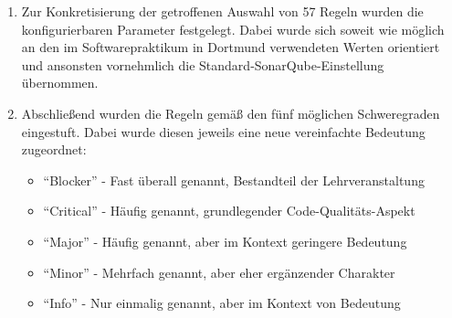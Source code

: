 \documentclass[da,ngerman]{stthesis}
\begin{document}
\begin{enumerate}
					\item Zur Konkretisierung der getroffenen Auswahl von 57 Regeln wurden die konfigurierbaren Parameter festgelegt. Dabei wurde sich soweit wie möglich an den im Softwarepraktikum in Dortmund verwendeten Werten orientiert \cite{ImproveCodeQuality} und ansonsten vornehmlich die Standard-SonarQube-Einstellung übernommen.
					\item Abschließend wurden die Regeln gemäß den fünf möglichen Schweregraden eingestuft. Dabei wurde diesen jeweils eine neue vereinfachte Bedeutung zugeordnet: 
						\begin{itemize}
							\item "`Blocker"' - Fast überall genannt, Bestandteil der Lehrveranstaltung
							\item "`Critical"' - Häufig genannt, grundlegender Code-Qualitäts-Aspekt
							\item "`Major"' - Häufig genannt, aber im Kontext geringere Bedeutung
							\item "`Minor"' - Mehrfach genannt, aber eher ergänzender Charakter
				\item "`Info"' - Nur einmalig genannt, aber im Kontext von Bedeutung
						\end{itemize}						 
				\end{enumerate}
\end{document}
